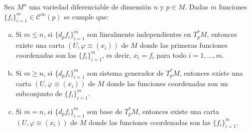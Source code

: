 \begin{cor}
Sea $M^n$ una variedad diferenciable de dimensión $n$ y $p \in M$. Dadas $m$ funciones $\{f_i\}_{i=1}^m \in \mathcal{C}^{\infty}(p)$ se cumple que: \vspace{-3mm}
\begin{enumerate}[a)]
\item Si $m \leq n$, si $\{d_pf_i\}_{i=1}^m$ son linealmente independientes en $T^*_pM$, entonces existe una carta $(U,\varphi\equiv(x_i))$ de $M$ donde las primeras funciones coordenadas son las $\{f_i\}_{i=1}^m$, es decir, $x_i = f_i$ para todo $i= 1,\dots,m$.
\item Si $m\geq n$, si $\{d_pf_i\}_{i=1}^m$ son sistema generador de $T^*_pM$, entonces existe una carta $(U,\varphi\equiv(x_i))$ de $M$ donde las funciones coordenadas son un subconjunto de $\{f_i\}_{i=1}^m$.
\item Si $m = n$, si $\{d_pf_i\}_{i=1}^m$ son base de $T^*_pM$, entonces existe una carta $(U,\varphi\equiv(x_i))$ de $M$ donde las funciones coordenadas son las $\{f_i\}_{i=1}^m$.
\end{enumerate}
\end{cor}
